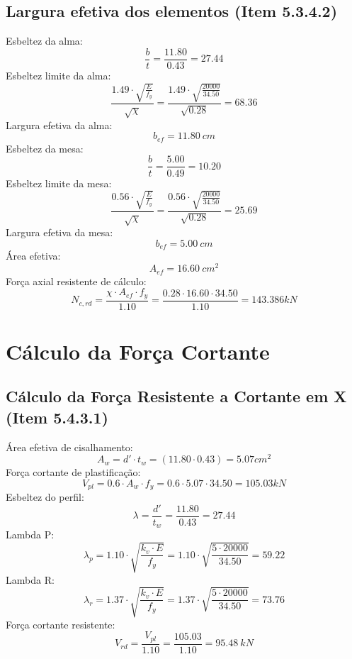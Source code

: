 \documentclass{article}%
\begin{document}
%
\subsection{Largura efetiva dos elementos (Item 5.3.4.2)}%
\label{subsec:Larguraefetivadoselementos(Item5.3.4.2)}%
Esbeltez da alma:%
\[%
\frac{b}{t} = \frac{11.80}{0.43} = 27.44 
%
\]%
Esbeltez limite da alma:%
\[%
\frac{1.49 \cdot \sqrt{\frac{E}{f_y}}}{\sqrt{\chi}}  = \frac{1.49 \cdot \sqrt{\frac{20000}{34.50}}}{\sqrt{0.28}}  = 68.36 
%
\]%
Largura efetiva da alma:%
\[%
 b_{ef} = 11.80 \ cm%
\]%
Esbeltez da mesa:%
\[%
\frac{b}{t} = \frac{5.00}{0.49} = 10.20 
%
\]%
Esbeltez limite da mesa:%
\[%
\frac{0.56 \cdot \sqrt{\frac{E}{f_y}}}{\sqrt{\chi}}  = \frac{0.56 \cdot \sqrt{\frac{20000}{34.50}}}{\sqrt{0.28}}  = 25.69 
%
\]%
Largura efetiva da mesa:%
\[%
 b_{ef} = 5.00 \ cm%
\]%
Área efetiva:%
\[%
 A_{ef} = 16.60 \ {cm}^2%
\]%
Força axial resistente de cálculo:%
\[%
 N_{c,rd} = \frac{\chi \cdot A_{ef} \cdot f_y}{1.10}  = \frac{0.28 \cdot 16.60 \cdot 34.50}{1.10}  = 143.386   kN 
%
\]

%
\section{Cálculo da Força Cortante}%
\label{sec:ClculodaForaCortante}%

%
\subsection{Cálculo da Força Resistente a Cortante em X (Item 5.4.3.1)}%
\label{subsec:ClculodaForaResistenteaCortanteemX(Item5.4.3.1)}%
Área efetiva de cisalhamento:%
\[%
A_w = d' \cdot t_w = (11.80 \cdot 0.43) = 5.07    {cm}^2%
\]%
Força cortante de plastificação:%
\[%
V_{pl} = 0.6 \cdot A_w \cdot f_y = 0.6 \cdot 5.07 \cdot 34.50 = 105.03    kN%
\]%
Esbeltez do perfil:%
\[%
\lambda = \frac{d'}{t_w} = \frac{11.80}{0.43} = 27.44%
\]%
Lambda P:%
\[%
\lambda_p = 1.10 \cdot \sqrt{\frac{{k_v \cdot E}}{{f_y}}} = 1.10 \cdot \sqrt{\frac{{5 \cdot 20000}}{{34.50}}} = 59.22 %
\]%
Lambda R:%
\[%
\lambda_r = 1.37 \cdot \sqrt{\frac{{k_v \cdot E}}{{f_y}}} = 1.37 \cdot \sqrt{\frac{{5 \cdot 20000}}{{34.50}}} = 73.76 %
\]%
Força cortante resistente:%
\[%
V_{rd} = \frac{V_{pl}}{1.10}  = \frac{105.03}{1.10} = 95.48   ~   kN%
\]

%
\end{document}
